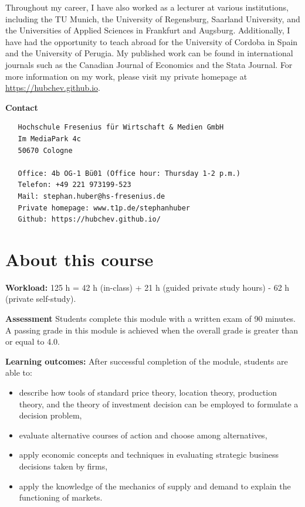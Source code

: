\documentclass[
  12pt,
  oneside]{book}
\providecommand{\tightlist}{%
  \setlength{\itemsep}{0pt}\setlength{\parskip}{0pt}}
\theoremstyle{definition}
\theoremstyle{definition}
\theoremstyle{definition}
\theoremstyle{definition}
\theoremstyle{remark}
\begin{document}
Throughout my career, I have also worked as a lecturer at various institutions, including the TU Munich, the University of Regensburg, Saarland University, and the Universities of Applied Sciences in Frankfurt and Augsburg. Additionally, I have had the opportunity to teach abroad for the University of Cordoba in Spain and the University of Perugia. My published work can be found in international journals such as the Canadian Journal of Economics and the Stata Journal. For more information on my work, please visit my private homepage at \url{https://hubchev.github.io}.

\textbf{Contact}

\begin{verbatim}
   Hochschule Fresenius für Wirtschaft & Medien GmbH
   Im MediaPark 4c
   50670 Cologne
   
   Office: 4b OG-1 Bü01 (Office hour: Thursday 1-2 p.m.)
   Telefon: +49 221 973199-523
   Mail: stephan.huber@hs-fresenius.de
   Private homepage: www.t1p.de/stephanhuber
   Github: https://hubchev.github.io/
\end{verbatim}

\hypertarget{about-this-course}{%
\section*{About this course}\label{about-this-course}}

\textbf{Workload:}
125 h = 42 h (in-class) + 21 h (guided private study hours) - 62 h (private self-study).

\textbf{Assessment}
Students complete this module with a written exam of 90 minutes. A passing grade in this module is achieved when the overall grade is greater than or equal to 4.0.

\textbf{Learning outcomes:}
After successful completion of the module, students are able to:

\begin{itemize}
\tightlist
\item
  describe how tools of standard price theory, location theory, production theory, and the theory of investment decision can be employed to formulate a decision problem,
\item
  evaluate alternative courses of action and choose among alternatives,
\item
  apply economic concepts and techniques in evaluating strategic business decisions taken by firms,
\item
  apply the knowledge of the mechanics of supply and demand to explain the functioning of markets.
\end{itemize}
\end{document}
